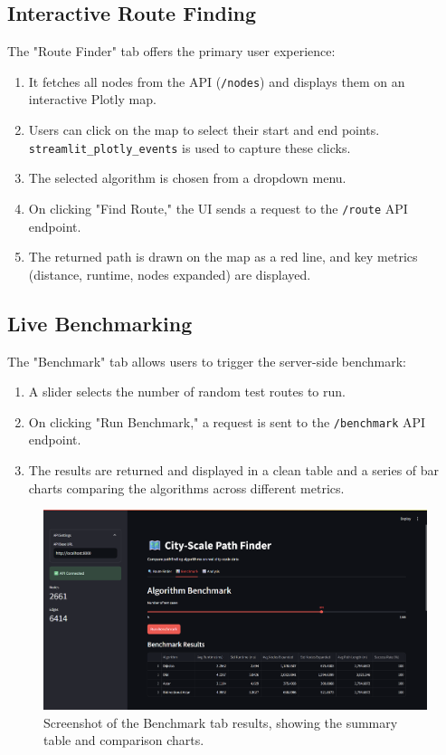 \documentclass[12pt, a4paper]{report}
\begin{document}
\subsection{Interactive Route Finding}
The "Route Finder" tab offers the primary user experience:
\begin{enumerate}
    \item It fetches all nodes from the API (\texttt{/nodes}) and displays them on an interactive Plotly map.
    \item Users can click on the map to select their start and end points. \texttt{streamlit\_plotly\_events} is used to capture these clicks.
    \item The selected algorithm is chosen from a dropdown menu.
    \item On clicking "Find Route," the UI sends a request to the \texttt{/route} API endpoint.
    \item The returned path is drawn on the map as a red line, and key metrics (distance, runtime, nodes expanded) are displayed.
\end{enumerate}

\subsection{Live Benchmarking}
The "Benchmark" tab allows users to trigger the server-side benchmark:
\begin{enumerate}
    \item A slider selects the number of random test routes to run.
    \item On clicking "Run Benchmark," a request is sent to the \texttt{/benchmark} API endpoint.
    \item The results are returned and displayed in a clean table and a series of bar charts comparing the algorithms across different metrics.
\end{enumerate}

\begin{figure}[h!]
    \centering
    \includegraphics[width=0.9\linewidth]{figures/benchmark_tab.png}
    \caption{Screenshot of the Benchmark tab results, showing the summary table and comparison charts.}
    \label{fig:benchmark_ui}
\end{figure}
\end{document}
